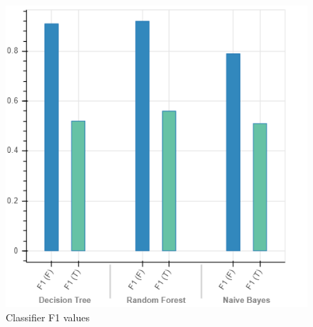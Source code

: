 \documentclass[10pt, conference, compsocconf]{IEEEtran}
\begin{document}
\begin{figure}
  \includegraphics[scale=0.45]{F1}
  \centering
  \caption{Classifier F1 values}
  \label{fig:f1}
\end{figure}
\end{document}
